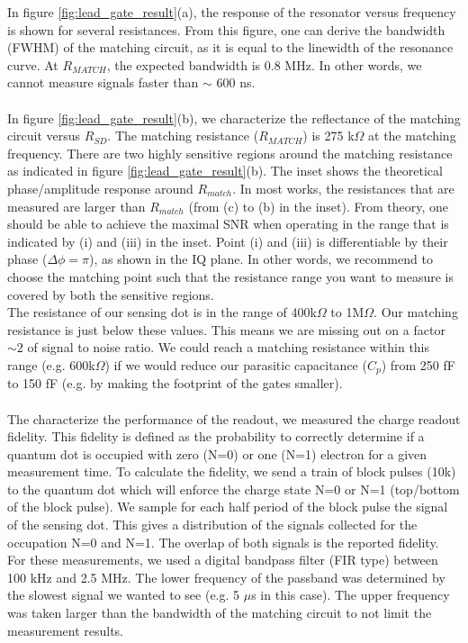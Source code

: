 \documentclass{article}
\begin{document}
	In figure \ref{fig:lead_gate_result}(a), the response of the resonator versus frequency is shown for several resistances. From this figure, one can derive the bandwidth (FWHM) of the matching circuit, as it is equal to the linewidth of the resonance curve. At $R_{MATCH}$, the expected bandwidth is 0.8 MHz. In other words, we cannot measure signals faster than $\sim$ 600 ns.
	\\ \\
	In figure \ref{fig:lead_gate_result}(b), we characterize the reflectance of the matching circuit versus $R_{SD}$. The matching resistance ($R_{MATCH}$) is 275 k$\Omega$ at the matching frequency. There are two highly sensitive regions around the matching resistance as indicated in figure \ref{fig:lead_gate_result}(b). The inset shows the theoretical phase/amplitude response around $R_{match}$. In most works, the resistances that are measured are larger than $R_{match}$ (from (c) to (b) in the inset).
	From theory, one should be able to achieve the maximal SNR when operating in the range that is indicated by (i) and (iii) in the inset. Point (i) and (iii) is differentiable by their phase ($\Delta \phi = \pi$), as shown in the IQ plane. In other words, we recommend to choose the matching point such that the resistance range you want to measure is covered by both the sensitive regions. \\
	The resistance of our sensing dot is in the range of 400k$\Omega$ to 1M$\Omega$. Our matching resistance is just below these values. This means we are missing out on a factor $\sim2$ of signal to noise ratio. We could reach a matching resistance within this range (e.g. 600k$\Omega$) if we would reduce our parasitic capacitance ($C_p$) from 250 fF to 150 fF (e.g. by making the footprint of the gates smaller).
	\\ \\
	The characterize the performance of the readout, we measured the charge readout fidelity. This fidelity is defined as the probability to correctly determine if a quantum dot is occupied with zero (N=0) or one (N=1) electron for a given measurement time. To calculate the fidelity, we send a train of block pulses (10k) to the quantum dot which will enforce the charge state N=0 or N=1 (top/bottom of the block pulse). We sample for each half period of the block pulse the signal of the sensing dot. This gives a distribution of the signals collected for the occupation N=0 and N=1. The overlap of both signals is the reported fidelity. For these measurements, we used a digital bandpass filter (FIR type) between 100 kHz and 2.5 MHz. The lower frequency of the passband was determined by the slowest signal we wanted to see (e.g. 5 $\mu$s in this case). The upper frequency was taken larger than the bandwidth of the matching circuit to not limit the measurement results.
\end{document}
